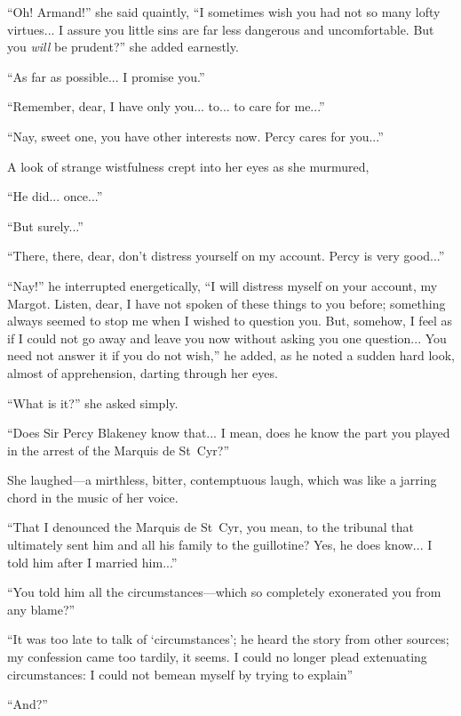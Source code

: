 \enquote{Oh! Armand!} she said quaintly, \enquote{I sometimes wish you had not so many lofty virtues... I assure you little sins are far less dangerous and uncomfortable. But you \textit{will} be prudent?} she added earnestly.

\enquote{As far as possible... I promise you.}

\enquote{Remember, dear, I have only you... to... to care for me...}

\enquote{Nay, sweet one, you have other interests now. Percy cares for you...}

A look of strange wistfulness crept into her eyes as she murmured,\longdash


\enquote{He did... once...}

\enquote{But surely...}

\enquote{There, there, dear, don't distress yourself on my account. Percy is very good...}

\enquote{Nay!} he interrupted energetically, \enquote{I will distress myself on your account, my Margot. Listen, dear, I have not spoken of these things to you before; something always seemed to stop me when I wished to question you. But, somehow, I feel as if I could not go away and leave you now without asking you one question... You need not answer it if you do not wish,} he added, as he noted a sudden hard look, almost of apprehension, darting through her eyes.

\enquote{What is it?} she asked simply.

\enquote{Does Sir Percy Blakeney know that... I mean, does he know the part you played in the arrest of the Marquis de St~Cyr?}

She laughed---a mirthless, bitter, contemptuous laugh, which was like a jarring chord in the music of her voice.

\enquote{That I denounced the Marquis de St~Cyr, you mean, to the tribunal that ultimately sent him and all his family to the guillotine? Yes, he does know... I told him after I married him...}

\enquote{You told him all the circumstances---which so completely exonerated you from any blame?}

\enquote{It was too late to talk of \enquote{circumstances}; he heard the story from other sources; my confession came too tardily, it seems. I could no longer plead extenuating circumstances: I could not bemean myself by trying to explain\longdash}

\enquote{And?}

